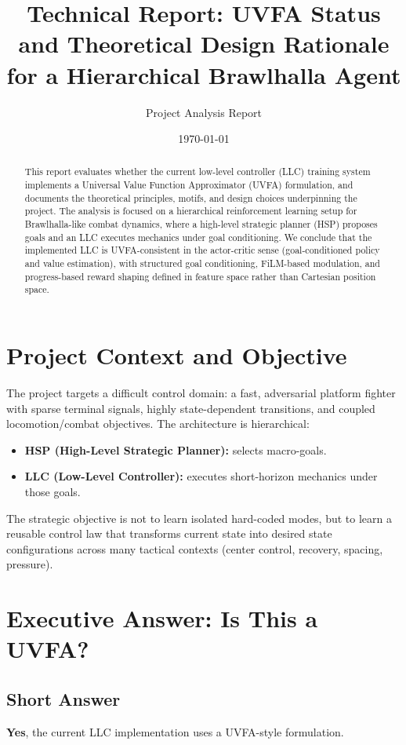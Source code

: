 \documentclass[11pt,a4paper]{article}
\title{Technical Report: UVFA Status and Theoretical Design Rationale\\for a Hierarchical Brawlhalla Agent}
\author{Project Analysis Report}
\date{\today}
\begin{document}
\maketitle

\begin{abstract}
This report evaluates whether the current low-level controller (LLC) training system implements a Universal Value Function Approximator (UVFA) formulation, and documents the theoretical principles, motifs, and design choices underpinning the project. The analysis is focused on a hierarchical reinforcement learning setup for Brawlhalla-like combat dynamics, where a high-level strategic planner (HSP) proposes goals and an LLC executes mechanics under goal conditioning. We conclude that the implemented LLC is UVFA-consistent in the actor-critic sense (goal-conditioned policy and value estimation), with structured goal conditioning, FiLM-based modulation, and progress-based reward shaping defined in feature space rather than Cartesian position space.
\end{abstract}

\section{Project Context and Objective}
The project targets a difficult control domain: a fast, adversarial platform fighter with sparse terminal signals, highly state-dependent transitions, and coupled locomotion/combat objectives. The architecture is hierarchical:
\begin{itemize}[leftmargin=1.5em]
    \item \textbf{HSP (High-Level Strategic Planner):} selects macro-goals.
    \item \textbf{LLC (Low-Level Controller):} executes short-horizon mechanics under those goals.
\end{itemize}

The strategic objective is not to learn isolated hard-coded modes, but to learn a reusable control law that transforms current state into desired state configurations across many tactical contexts (center control, recovery, spacing, pressure).

\section{Executive Answer: Is This a UVFA?}
\subsection{Short Answer}
\textbf{Yes}, the current LLC implementation uses a UVFA-style formulation.
\end{document}
